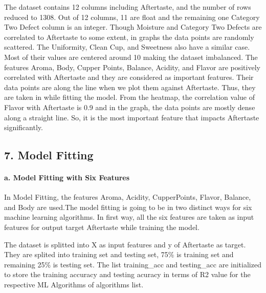 \documentclass[11pt]{article}
\begin{document}
The dataset contains 12 columns including Aftertaste, and the number of
rows reduced to 1308. Out of 12 columns, 11 are float and the remaining
one Category Two Defect column is an integer. Though Moisture and
Category Two Defects are correlated to Aftertaste to some extent, in
graphs the data points are randomly scattered. The Uniformity, Clean
Cup, and Sweetness also have a similar case. Most of their values are
centered around 10 making the dataset imbalanced. The features Aroma,
Body, Cupper Points, Balance, Acidity, and Flavor are positively
correlated with Aftertaste and they are considered as important
features. Their data points are along the line when we plot them against
Aftertaste. Thus, they are taken in while fitting the model. From the
heatmap, the correlation value of Flavor with Aftertaste is 0.9 and in
the graph, the data points are mostly dense along a straight line. So,
it is the most important feature that impacts Aftertaste significantly.

    \hypertarget{model-fitting}{%
\subsection{7. Model Fitting}\label{model-fitting}}

    \hypertarget{a.-model-fitting-with-six-features}{%
\paragraph{a. Model Fitting with Six
Features}\label{a.-model-fitting-with-six-features}}

    In Model Fitting, the features Aroma, Acidity, CupperPoints, Flavor,
Balance, and Body are used.The model fitting is going to be in two
distinct ways for six machine learning algorithms. In first way, all the
six features are taken as input features for output target Aftertaste
while training the model.

The dataset is splitted into X as input features and y of Aftertaste as
target. They are splited into training set and testing set, 75\% is
training set and remaining 25\% is testing set. The list training\_acc
and testing\_acc are initialized to store the training accuracy and
testing acuracy in terms of R2 value for the respective ML Algorithms of
algorithms list.
\end{document}
